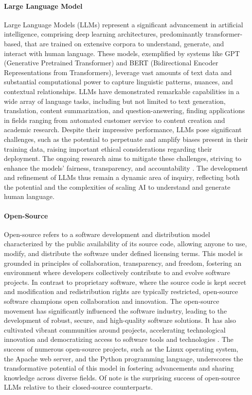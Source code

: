 \documentclass{article}
\begin{document}
\paragraph{Large Language Model}
Large Language Models (LLMs) represent a significant advancement in artificial intelligence, comprising deep learning architectures, predominantly transformer-based, that are trained on extensive corpora to understand, generate, and interact with human language. These models, exemplified by systems like GPT (Generative Pretrained Transformer) and BERT (Bidirectional Encoder Representations from Transformers), leverage vast amounts of text data and substantial computational power to capture linguistic patterns, nuances, and contextual relationships. LLMs have demonstrated remarkable capabilities in a wide array of language tasks, including but not limited to text generation, translation, content summarization, and question-answering, finding applications in fields ranging from automated customer service to content creation and academic research. Despite their impressive performance, LLMs pose significant challenges, such as the potential to perpetuate and amplify biases present in their training data, raising important ethical considerations regarding their deployment. The ongoing research aims to mitigate these challenges, striving to enhance the models' fairness, transparency, and accountability \cite{BrownEtAl2020, DevlinEtAl2019}. The development and refinement of LLMs thus remain a dynamic area of inquiry, reflecting both the potential and the complexities of scaling AI to understand and generate human language.

\paragraph{Open-Source}
Open-source refers to a software development and distribution model characterized by the public availability of its source code, allowing anyone to use, modify, and distribute the software under defined licensing terms. This model is grounded in principles of collaboration, transparency, and freedom, fostering an environment where developers collectively contribute to and evolve software projects. In contrast to proprietary software, where the source code is kept secret and modification and redistribution rights are typically restricted, open-source software champions open collaboration and innovation. The open-source movement has significantly influenced the software industry, leading to the development of robust, secure, and high-quality software solutions. It has also cultivated vibrant communities around projects, accelerating technological innovation and democratizing access to software tools and technologies \cite{Raymond1999, Weber2004}. The success of numerous open-source projects, such as the Linux operating system, the Apache web server, and the Python programming language, underscores the transformative potential of this model in fostering advancements and sharing knowledge across diverse fields. Of note is the surprising success of open-source LLMs relative to their closed-source counterparts\cite{huggingfaceLMSysChatbot, semianalysisGoogleHave}.
\end{document}
